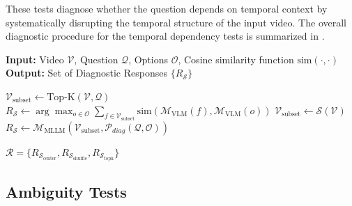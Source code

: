         These tests diagnose whether the question depends on temporal context by systematically disrupting the temporal structure of the input video. The overall diagnostic procedure for the temporal dependency tests is summarized in .
    
        \begin{algorithm}[t]
        \caption{Temporal Dependency Diagnostic Procedure}
        \label{alg:diagnostic}
        \begin{algorithmic}[1]
        \State \textbf{Input:} Video $\mathcal{V}$, Question $\mathcal{Q}$, Options $\mathcal{O}$, Cosine similarity function $\text{sim}(\cdot, \cdot)$
        \State \textbf{Output:} Set of Diagnostic Responses $\{R_{\mathcal{S}}\}$
        
                \State $\mathcal{V}_{\text{subset}} \gets \text{Top-K}(\mathcal{V}, \mathcal{Q})$ 
                \State $R_{\mathcal{S}} \gets \arg\max_{o \in \mathcal{O}} \sum_{f \in \mathcal{V}_{\text{subset}}} \text{sim}(\mathcal{M}_{\text{VLM}}(f), \mathcal{M}_{\text{VLM}}(o))$ 
            \Else
                \State $\mathcal{V}_{\text{subset}} \gets \mathcal{S}(\mathcal{V})$ 
                \State $R_{\mathcal{S}} \gets \mathcal{M}_{\text{MLLM}}(\mathcal{V}_{\text{subset}}, \mathcal{P}_{diag}(\mathcal{Q}, \mathcal{O}))$ 
            \EndIf
        \EndFor
        
        \State \Return $\mathcal{R} = \{R_{\mathcal{S}_{\text{center}}}, R_{\mathcal{S}_{\text{shuffle}}}, R_{\mathcal{S}_{\text{topk}}}\}$
        \end{algorithmic}
        \end{algorithm} 

    \clearpage

    \subsection{Ambiguity Tests}
    
